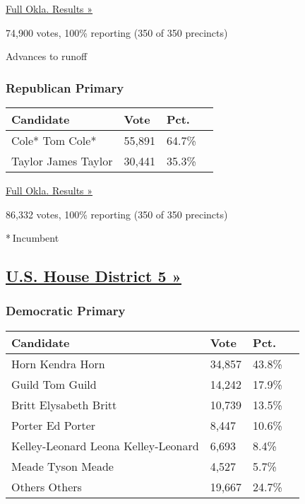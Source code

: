 \href{https://www.nytimes3xbfgragh.onion/elections/results/oklahoma}{Full
Okla. Results »}

74,900 votes, 100\% reporting (350 of 350 precincts)

 Advances to runoff

\hypertarget{republican-primary-4}{%
\subsubsection{Republican Primary}\label{republican-primary-4}}

\begin{longtable}[]{@{}llll@{}}
\toprule
Candidate & Vote & Pct. &\tabularnewline
\midrule
\endhead
 Cole* Tom Cole* & 55,891 & 64.7\% &\tabularnewline
 Taylor James Taylor & 30,441 & 35.3\% &\tabularnewline
\bottomrule
\end{longtable}

\href{https://www.nytimes3xbfgragh.onion/elections/results/oklahoma}{Full
Okla. Results »}

86,332 votes, 100\% reporting (350 of 350 precincts)

* Incumbent

\hypertarget{us-house-district-5-}{%
\subsection{\texorpdfstring{\href{https://www.nytimes3xbfgragh.onion/elections/results/oklahoma-house-district-5-primary-election}{U.S.
House District 5
»}}{U.S. House District 5 »}}\label{us-house-district-5-}}

\hypertarget{democratic-primary-5}{%
\subsubsection{Democratic Primary}\label{democratic-primary-5}}

\begin{longtable}[]{@{}llll@{}}
\toprule
Candidate & Vote & Pct. &\tabularnewline
\midrule
\endhead
 Horn Kendra Horn & 34,857 & 43.8\% &\tabularnewline
 Guild Tom Guild & 14,242 & 17.9\% &\tabularnewline
 Britt Elysabeth Britt & 10,739 & 13.5\% &\tabularnewline
 Porter Ed Porter & 8,447 & 10.6\% &\tabularnewline
 Kelley-Leonard Leona Kelley-Leonard & 6,693 & 8.4\% &\tabularnewline
 Meade Tyson Meade & 4,527 & 5.7\% &\tabularnewline
 Others Others & 19,667 & 24.7\% &\tabularnewline
\bottomrule
\end{longtable}

